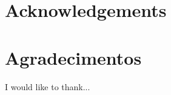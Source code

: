 \thispagestyle{plain}

{\section*{Acknowledgements}}
{\section*{Agradecimentos}}


I would like to thank...


